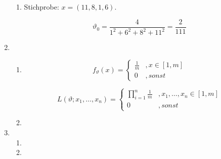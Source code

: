 \documentclass[a4paper]{scrartcl}
\def \blattnr {7}
\begin{document}
\begin{enumerate}[label=\bfseries \blattnr.\arabic*]
\begin{enumerate}
\item 
Stichprobe: $x = (11,8,1,6)$.
  
\begin{equation*}
\vartheta_0 = \frac{4}{1^2 + 6^2 + 8^2 + 11^2} = \frac2{111} 
\end{equation*}

\end{enumerate}

\item 
\begin{enumerate}
\item 

\begin{equation*}
 f_\vartheta(x) = \begin{cases}
		    \frac1m &, x \in [1,m] \\
		    0 &, sonst
                  \end{cases}
\end{equation*}

\begin{equation*}
 L(\vartheta;x_1,\ldots,x_n) = \begin{cases}
		    \prod_{i=1}^n\frac1m &, x_1,\ldots,x_n \in [1,m] \\
		    0 &, sonst
                  \end{cases}
\end{equation*}
 


\item 
\end{enumerate}

\item 
\begin{enumerate}
\item 
\item 
\end{enumerate}

\end{enumerate}
\end{document}

